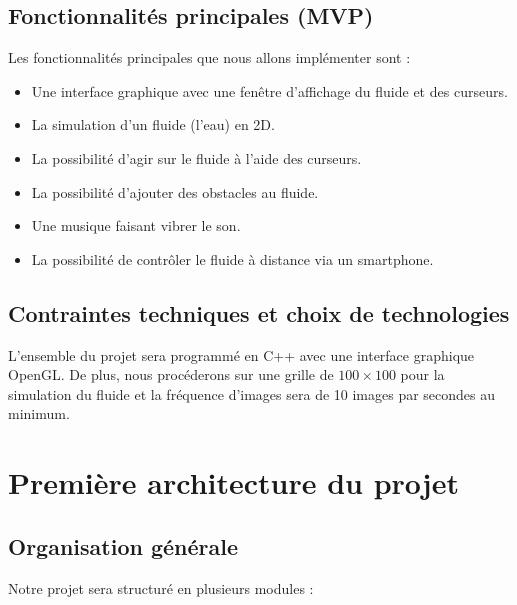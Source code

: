 \documentclass{article}
\begin{document}
   \subsection{Fonctionnalités principales (MVP)}

   Les fonctionnalités principales que nous allons implémenter sont :
   \begin{itemize}
      \item Une interface graphique avec une fenêtre d'affichage du fluide et des curseurs.
      \item La simulation d'un fluide (l'eau) en 2D.
      \item La possibilité d'agir sur le fluide à l'aide des curseurs.
      \item La possibilité d'ajouter des obstacles au fluide.
      \item Une musique faisant vibrer le son.
      \item La possibilité de contrôler le fluide à distance via un smartphone.
   \end{itemize}

   \subsection{Contraintes techniques et choix de technologies}

   L'ensemble du projet sera programmé en C++ avec une interface graphique OpenGL.
   De plus, nous procéderons sur une grille de $100 \times 100$ pour la simulation du fluide et 
   la fréquence d'images sera de 10 images par secondes au minimum.
	
   \section{Première architecture du projet}
   
   \subsection{Organisation générale}\label{partie 3.1}
   Notre projet sera structuré en plusieurs modules :
\end{document}
